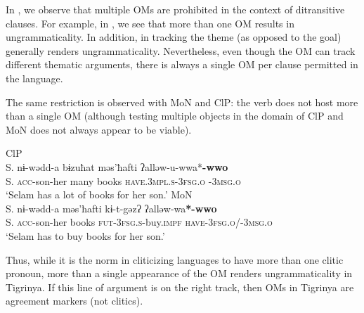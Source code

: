 \documentclass[output=paper]{langscibook}
\begin{document}
\noindent In , we observe that multiple OMs are prohibited in the context of ditransitive clauses. For example, in , we see that more than one OM results in ungrammaticality. In addition, in  tracking the theme (as opposed to the goal) generally renders ungrammaticality. Nevertheless, even though the OM can track different thematic arguments, there is always a single OM per clause permitted in the language. 

The same restriction is observed with MoN and ClP: the verb does not host more than a single OM (although testing multiple objects in the domain of ClP and MoN does not always appear to be viable).

\ea
\ea\label{ex:Gebregziabher:double4} ClP \\
\gll S. nɨ-wədd-a bɨzuħat məs'ħafti ʔalləw-u-wwa*{\textbf{-wwo}} \\
S. {\scshape acc-}son-her many books {\scshape have.3mpl.s-3fsg.o} {\scshape -3msg.o}\\
\glt `Selam has a lot of books for her son.'
\ex\label{ex:Gebregziabher:modagr4} MoN \\
\gll S. nɨ-wədd-a məs'ħafti kɨ-t-gəzʔ ʔalləw-wa{\textbf{*-wwo}} \\
S. {\scshape acc-}son-her books {\scshape fut-3fsg.s-}buy.{\scshape impf} {\scshape have-3fsg.o}/{\scshape -3msg.o} \\
\glt `Selam has to buy books for her son.'
\z
\z

\noindent Thus, while it is the norm in cliticizing languages to have more than one clitic pronoun, more than a single appearance of the OM renders ungrammaticality in Tigrinya. 
If this line of argument is on the right track, then OMs in Tigrinya are agreement markers (not clitics).
\end{document}
